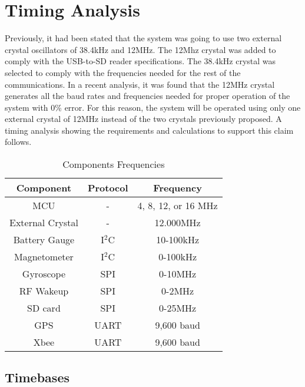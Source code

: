 \section{Timing Analysis}

Previously, it had been stated that the system was going to use two external crystal oscillators of 38.4kHz and 12MHz. The 12Mhz crystal was added to comply with the USB-to-SD reader specifications.  The 38.4kHz crystal was selected to comply with the frequencies needed for the rest of the communications. In a recent analysis, it was found that the 12MHz crystal generates all the baud rates and frequencies needed for proper operation of the system with 0\% error. For this reason, the system will be operated using only one external crystal of 12MHz instead of the two crystals previously proposed.  A timing analysis showing the requirements and calculations to support this claim follows.

\begin{table}[H]
  \centering
  \caption{Components Frequencies}
    \begin{tabular}{|c|c|c|}
    \hline
    \rowcolor{Gray}
    Component & Protocol & Frequency \\
    \hline \hline
    MCU   & -     & 4, 8, 12, or 16 MHz \\ \hline
    External Crystal & -     & 12.000MHz \\ \hline
    Battery Gauge & I$^2$C & 10-100kHz \\ \hline
    Magnetometer & I$^2$C & 0-100kHz \\ \hline
    Gyroscope & SPI   & 0-10MHz \\ \hline
    RF Wakeup & SPI   & 0-2MHz \\ \hline
    SD card & SPI   & 0-25MHz \\ \hline
    GPS   & UART  & 9,600 baud \\ \hline
    Xbee  & UART   & 9,600 baud \\ \hline
    \end{tabular}%
  \label{tab:compFreq}%
\end{table}%

\subsection{Timebases}
